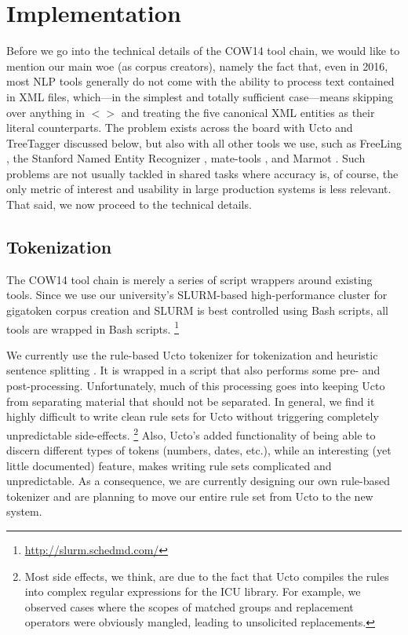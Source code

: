 \documentclass[11pt]{article}
\begin{document}
\section{Implementation}
\label{sec:implementation}

Before we go into the technical details of the COW14 tool chain, we would like to mention our main woe (as corpus creators), namely the fact that, even in 2016, most NLP tools generally do not come with the ability to process text contained in XML files, which---in the simplest and totally sufficient case---means skipping over anything in $<>$ and treating the five canonical XML entities as their literal counterparts.
The problem exists across the board with Ucto and TreeTagger discussed below, but also with all other tools we use, such as FreeLing \cite{PadroStanislavsky2012}, the Stanford Named Entity Recognizer \cite{FaruquiPado2010}, mate-tools \cite{BohnetNivre2012}, and Marmot \cite{MuellerEa2013}.
Such problems are not usually tackled in shared tasks where accuracy is, of course, the only metric of interest and usability in large production systems is less relevant.
That said, we now proceed to the technical details.

\subsection{Tokenization}
\label{sec:tokenizer}

The COW14 tool chain is merely a series of script wrappers around existing tools.
Since we use our university's SLURM-based high-performance cluster for gigatoken corpus creation and SLURM is best controlled using Bash scripts, all tools are wrapped in Bash scripts.%
\footnote{\url{http://slurm.schedmd.com/}}

We currently use the rule-based Ucto tokenizer for tokenization and heuristic sentence splitting \cite{ucto}.
It is wrapped in a script that also performs some pre- and post-processing.
Unfortunately, much of this processing goes into keeping Ucto from separating material that should not be separated.
In general, we find it highly difficult to write clean rule sets for Ucto without triggering completely unpredictable side-effects.%
\footnote{Most side effects, we think, are due to the fact that Ucto compiles the rules into complex regular expressions for the ICU library.
For example, we observed cases where the scopes of matched groups and replacement operators were obviously mangled, leading to unsolicited replacements.}
Also, Ucto's added functionality of being able to discern different types of tokens (numbers, dates, etc.), while an interesting (yet little documented) feature, makes writing rule sets complicated and unpredictable.
As a consequence, we are currently designing our own rule-based tokenizer and are planning to move our entire rule set from Ucto to the new system.
\end{document}
